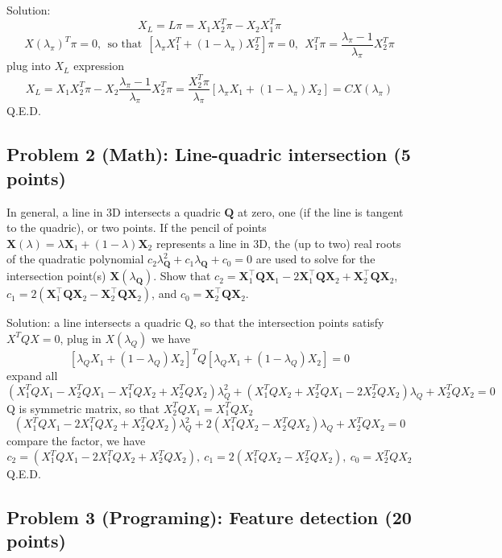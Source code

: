 \documentclass[11pt]{article}
\begin{document}
    Solution: \[X_{L}=L\pi=X_{1}X_{2}^{T}\pi-X_{2}X_{1}^{T}\pi\]
\[X(\lambda_{\pi})^{T}\pi=0, \ \ \text{so that}\ \  [\lambda_\pi X_{1}^{T}+(1-\lambda_\pi)X_{2}^{T}]\pi=0, \ \ X_{1}^{T}\pi=\frac{\lambda_{\pi}-1}{\lambda_{\pi}}X_{2}^{T}\pi\]
plug into \(X_L\) expression
\[X_{L}=X_{1}X_{2}^{T}\pi-X_{2}\frac{\lambda_{\pi}-1}{\lambda_{\pi}}X_{2}^{T}\pi=\frac{X_2^{T}\pi}{\lambda_{\pi}}[\lambda_{\pi} X_{1}+(1-\lambda_{\pi})X_{2}]=CX(\lambda_{\pi})\]
Q.E.D.

    \hypertarget{problem-2-math-line-quadric-intersection-5-points}{%
\subsection{Problem 2 (Math): Line-quadric intersection (5
points)}\label{problem-2-math-line-quadric-intersection-5-points}}

In general, a line in 3D intersects a quadric \(\boldsymbol{Q}\) at
zero, one (if the line is tangent to the quadric), or two points. If the
pencil of points
\(\boldsymbol{X}(\lambda) = \lambda \boldsymbol{X}_1 + (1 -  \lambda) \boldsymbol{X}_2\)
represents a line in 3D, the (up to two) real roots of the quadratic
polynomial
\(c_2 \lambda_{\boldsymbol{Q}}^2 + c_1  \lambda_{\boldsymbol{Q}} + c_0 = 0\)
are used to solve for the intersection point(s)
\(\boldsymbol{X}(\lambda_{\boldsymbol{Q}})\). Show that
\(c_2 =  \boldsymbol{X}_1^\top \boldsymbol{Q} \boldsymbol{X}_1 - 2 \boldsymbol{X}_1^\top \boldsymbol{Q}  \boldsymbol{X}_2 + \boldsymbol{X}_2^\top \boldsymbol{Q} \boldsymbol{X}_2\),
\(c_1 = 2 (  \boldsymbol{X}_1^\top \boldsymbol{Q} \boldsymbol{X}_2 - \boldsymbol{X}_2^\top \boldsymbol{Q}  \boldsymbol{X}_2 )\),
and \(c_0 = \boldsymbol{X}_2^\top \boldsymbol{Q} \boldsymbol{X}_2\).

    Solution: a line intersects a quadric Q, so that the intersection points
satisfy \(X^{T}QX=0\), plug in \(X(\lambda_Q)\) we have
\[[\lambda_Q X_1+(1-\lambda_Q)X_2]^T Q[\lambda_Q X_1+(1-\lambda_Q)X_2]=0\]
expand all
\[(X_1^T QX_1-X_2^T QX_1-X_1^T QX_2+X_2^T QX_2)\lambda_Q^2+(X_1^TQX_2+X_2^TQX_1-2X_2^TQX_2)\lambda_Q+X_2^TQX_2=0\]
Q is symmetric matrix, so that \(X_2^T QX_1=X_1^T QX_2\)\\
\[(X_1^T QX_1-2X_1^T QX_2+X_2^T QX_2)\lambda_Q^2+2(X_1^TQX_2-X_2^TQX_2)\lambda_Q+X_2^TQX_2=0\]
compare the factor, we have
\[c_2=(X_1^T QX_1-2X_1^T QX_2+X_2^T QX_2),\  c_1=2(X_1^TQX_2-X_2^TQX_2),\  c_0=X_2^TQX_2\]
Q.E.D.

    \hypertarget{problem-3-programing-feature-detection-20-points}{%
\subsection{Problem 3 (Programing): Feature detection (20
points)}\label{problem-3-programing-feature-detection-20-points}}
\end{document}
